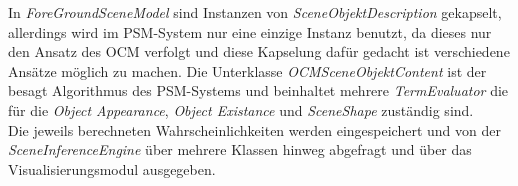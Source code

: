 In \textit{ForeGroundSceneModel} sind Instanzen von \textit{SceneObjektDescription} gekapselt, allerdings wird im PSM-System nur eine einzige Instanz benutzt, da dieses nur den Ansatz des OCM verfolgt und diese Kapselung dafür gedacht ist verschiedene Ansätze möglich zu machen. Die Unterklasse \textit{OCMSceneObjektContent} ist der besagt Algorithmus des PSM-Systems und beinhaltet mehrere \textit{TermEvaluator} die für die \textit{Object Appearance}, \textit{Object Existance} und \textit{SceneShape} zuständig sind.\smallskip\\
Die jeweils berechneten Wahrscheinlichkeiten werden eingespeichert und von der \textit{SceneInferenceEngine} über mehrere Klassen hinweg abgefragt und über das Visualisierungsmodul ausgegeben.\cite{gehrung14}



